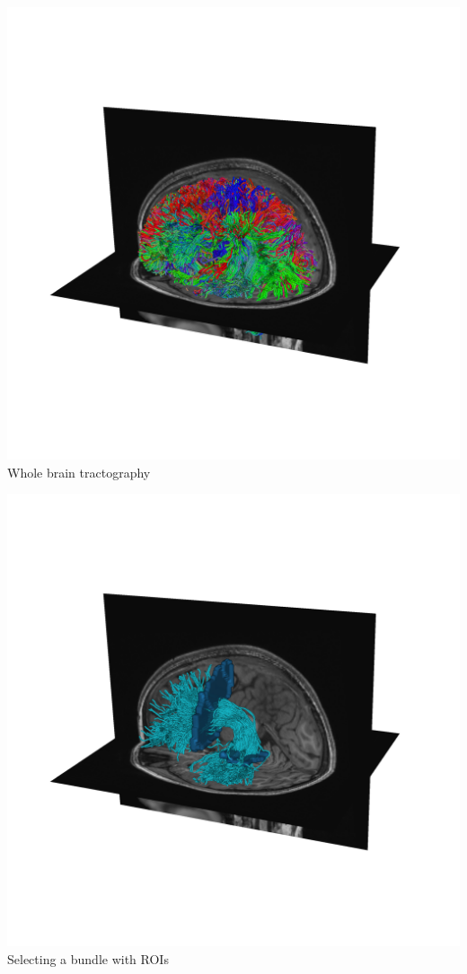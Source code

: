 \documentclass[a0paper,landscape,fontscale=0.365]{baposter}
\newenvironment{Figure}
  {\par\medskip\noindent\minipage{\linewidth}}
  {\endminipage\par\medskip}
\begin{document}
\begin{poster}
{\begin{multicols}{4}
    \begin{Figure}
        \centering
        \includegraphics[width=1.0\linewidth]{figures/whole_brain_trk}
        Whole brain tractography
    \end{Figure}
    \columnbreak
    \begin{Figure}
        \centering
        \includegraphics[width=1.0\linewidth]{figures/arc_trk}
        Selecting a bundle with ROIs
    \end{Figure}


\end{multicols}}
\end{poster}
\end{document}

